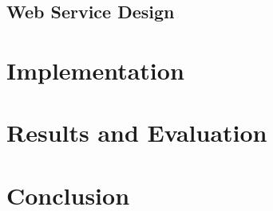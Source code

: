 \documentclass[11pt,twoside,a4paper]{article}
\begin{document}
\subsection{Web Service Design}

\section{Implementation}

\section{Results and Evaluation}

\section{Conclusion}


\end{document}
